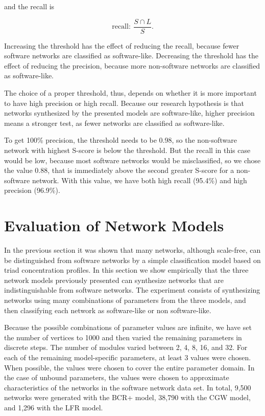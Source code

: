 and the recall is

$$
\mathrm{recall}: ~\frac{S \cap L}{S}.
$$

Increasing the threshold has the effect of reducing the recall, because fewer
software networks are classified as software-like. Decreasing the threshold has
the effect of reducing the precision, because more non-software networks are
classified as software-like. 

The choice of a proper threshold, thus, depends on whether it is more important
to have high precision or high recall. Because our research hypothesis is that
networks synthesized by the presented models are software-like, higher
precision means a stronger test, as fewer networks are classified as
software-like.

To get 100\% precision, the threshold needs to be 0.98, so the non-software
network with highest S-score is below the threshold. But the recall in this
case would be low, because most software networks would be misclassified, so we
chose the value 0.88, that is immediately above the second greater S-score for
a non-software network. With this value, we have both high recall (95.4\%) and
high precision (96.9\%).


\section{Evaluation of Network Models} \label{sec:evaluation}

In the previous section it was shown that many networks, although scale-free,
can be distinguished from software networks by a simple classification model
based on triad concentration profiles. In this section we show empirically that
the three network models previously presented can synthesize networks that are
indistinguishable from software networks. The experiment consists of
synthesizing networks using many combinations of parameters from the three
models, and then classifying each network as software-like or non
software-like. 

Because the possible combinations of parameter values are infinite, we have set
the number of vertices to 1000 and then varied the remaining parameters in
discrete steps. The number of modules varied between 2, 4, 8, 16, and 32. For
each of the remaining model-specific parameters, at least 3 values were chosen.
When possible, the values were chosen to cover the entire parameter domain. In
the case of unbound parameters, the values were chosen to approximate
characteristics of the networks in the software network data set. In total,
9,500 networks were generated with the BCR+ model, 38,790 with the CGW model,
and 1,296 with the LFR model.

